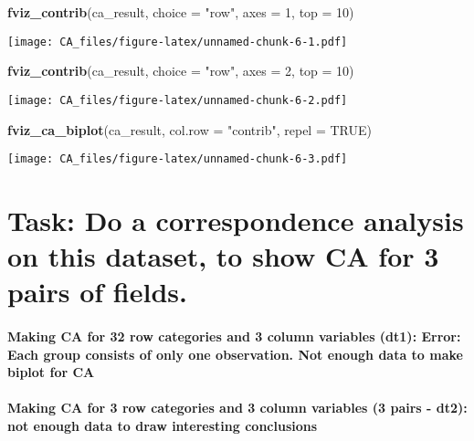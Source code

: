 \documentclass[]{article}
\newenvironment{Shaded}{\begin{snugshade}}{\end{snugshade}}
\newcommand{\KeywordTok}[1]{\textcolor[rgb]{0.13,0.29,0.53}{\textbf{#1}}}
\newcommand{\DataTypeTok}[1]{\textcolor[rgb]{0.13,0.29,0.53}{#1}}
\newcommand{\DecValTok}[1]{\textcolor[rgb]{0.00,0.00,0.81}{#1}}
\newcommand{\StringTok}[1]{\textcolor[rgb]{0.31,0.60,0.02}{#1}}
\newcommand{\OtherTok}[1]{\textcolor[rgb]{0.56,0.35,0.01}{#1}}
\newcommand{\NormalTok}[1]{#1}
\let\oldparagraph\paragraph
\renewcommand{\paragraph}[1]{\oldparagraph{#1}\mbox{}}
\begin{document}
\begin{Shaded}
\begin{Highlighting}[]
\KeywordTok{fviz_contrib}\NormalTok{(ca_result, }\DataTypeTok{choice =} \StringTok{"row"}\NormalTok{, }\DataTypeTok{axes =} \DecValTok{1}\NormalTok{, }\DataTypeTok{top =} \DecValTok{10}\NormalTok{)}
\end{Highlighting}
\end{Shaded}

\texttt{[image: CA\_files/figure-latex/unnamed-chunk-6-1.pdf]}

\begin{Shaded}
\begin{Highlighting}[]
\KeywordTok{fviz_contrib}\NormalTok{(ca_result, }\DataTypeTok{choice =} \StringTok{"row"}\NormalTok{, }\DataTypeTok{axes =} \DecValTok{2}\NormalTok{, }\DataTypeTok{top =} \DecValTok{10}\NormalTok{) }
\end{Highlighting}
\end{Shaded}

\texttt{[image: CA\_files/figure-latex/unnamed-chunk-6-2.pdf]}

\begin{Shaded}
\begin{Highlighting}[]
\KeywordTok{fviz_ca_biplot}\NormalTok{(ca_result, }\DataTypeTok{col.row =} \StringTok{"contrib"}\NormalTok{, }\DataTypeTok{repel =} \OtherTok{TRUE}\NormalTok{) }
\end{Highlighting}
\end{Shaded}

\texttt{[image: CA\_files/figure-latex/unnamed-chunk-6-3.pdf]}

\section{Task: Do a correspondence analysis on this dataset, to show CA
for 3 pairs of
fields.}\label{task-do-a-correspondence-analysis-on-this-dataset-to-show-ca-for-3-pairs-of-fields.}

\paragraph{Making CA for 32 row categories and 3 column variables (dt1):
Error: Each group consists of only one observation. Not enough data to
make biplot for
CA}\label{making-ca-for-32-row-categories-and-3-column-variables-dt1-error-each-group-consists-of-only-one-observation.-not-enough-data-to-make-biplot-for-ca}

\paragraph{Making CA for 3 row categories and 3 column variables (3
pairs - dt2): not enough data to draw interesting
conclusions}\label{making-ca-for-3-row-categories-and-3-column-variables-3-pairs---dt2-not-enough-data-to-draw-interesting-conclusions}
\end{document}
